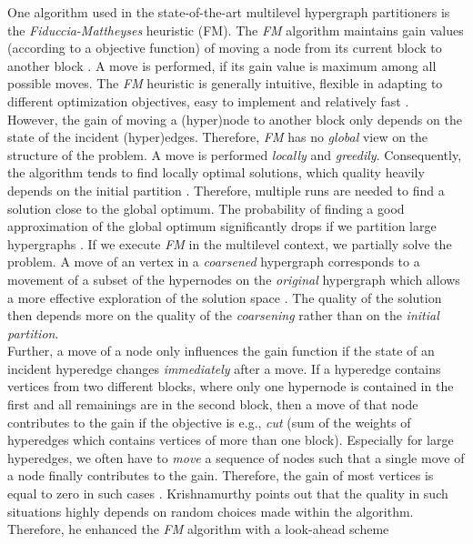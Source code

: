 One algorithm used in the state-of-the-art multilevel hypergraph partitioners is
the \emph{Fiduccia-Mattheyses} heuristic (FM). The \emph{FM} algorithm
maintains gain values (according to a objective function) of moving a node
from its current block to another block \cite{fiduccia1988linear}. A move is performed, 
if its gain value is maximum among all possible moves. The \emph{FM} heuristic is generally
intuitive, flexible in adapting to different optimization objectives, easy to implement and
relatively fast \cite{zhao2002effective}. \\
However, the gain of moving a (hyper)node to another block only depends on the state of the
incident (hyper)edges. Therefore, \emph{FM} has no \emph{global} view on the structure
of the problem. A move is performed \emph{locally} and \emph{greedily}.
Consequently, the algorithm tends to find locally optimal solutions, which quality heavily depends
on the initial partition \cite{dutt1997vlsi}. Therefore, multiple runs are needed to find
a solution close to the global optimum. The probability of finding a good approximation
of the global optimum significantly drops if we partition large hypergraphs \cite{dutt1997vlsi}.
If we execute \emph{FM} in the multilevel context, we partially solve the problem.
A move of an vertex in a \emph{coarsened} hypergraph corresponds to a movement
of a subset of the hypernodes on the \emph{original} hypergraph which allows a more 
effective exploration of the solution space \cite{papa2007hypergraph}. The quality of
the solution then depends more on the quality of the \emph{coarsening} rather than
on the \emph{initial partition}.\\
Further, a move of a node only influences the gain function if the state of an incident hyperedge
changes \emph{immediately} after a move. If a hyperedge contains vertices from two different blocks,
where only one hypernode is contained in the first and all remainings are in the second block,
then a move of that node contributes to the gain if the objective is e.g., \emph{cut} 
(sum of the weights of hyperedges which contains vertices of more than one block). 
Especially for large hyperedges, we often have to \emph{move} a sequence of nodes
such that a single move of a node finally contributes to the gain.
Therefore, the gain of most vertices is equal to zero in such cases \cite{mann2014formula}. 
Krishnamurthy \cite{krishnamurthy1984improved} points out that the quality 
in such situations highly depends on random choices made within
the algorithm. Therefore, he enhanced the \emph{FM} algorithm with a look-ahead scheme
